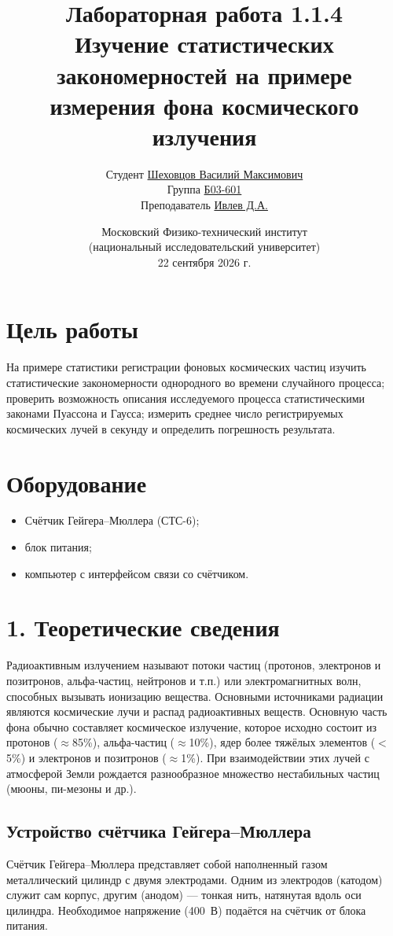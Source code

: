 \documentclass[12pt,a4paper]{article}
\title{\textbf{Лабораторная работа 1.1.4}\\
Изучение статистических закономерностей на примере измерения фона космического излучения}
\author{
    Студент \underline{Шеховцов Василий Максимович}\\
    Группа \underline{Б03-601}\\
    Преподаватель \underline{Ивлев Д.А.}
}
\date{Московский Физико-технический институт\\
(национальный исследовательский университет)\\
22 сентября 2026 г.}
\begin{document}
\maketitle

\section*{Цель работы}

На примере статистики регистрации фоновых космических частиц изучить статистические закономерности однородного во времени случайного процесса; проверить возможность описания исследуемого процесса статистическими законами Пуассона и Гаусса; измерить среднее число регистрируемых космических лучей в секунду и определить погрешность результата.

\section*{Оборудование}

\begin{itemize}
    \item Счётчик Гейгера--Мюллера (СТС-6);
    \item блок питания;
    \item компьютер с интерфейсом связи со счётчиком.
\end{itemize}

\section*{1. Теоретические сведения}

Радиоактивным излучением называют потоки частиц (протонов, электронов и позитронов, альфа-частиц, нейтронов и т.п.) или электромагнитных волн, способных вызывать ионизацию вещества. Основными источниками радиации являются космические лучи и распад радиоактивных веществ. Основную часть фона обычно составляет космическое излучение, которое исходно состоит из протонов ($\approx$85\%), альфа-частиц ($\approx$10\%), ядер более тяжёлых элементов ($<$5\%) и электронов и позитронов ($\approx$1\%). При взаимодействии этих лучей с атмосферой Земли рождается разнообразное множество нестабильных частиц (мюоны, пи-мезоны и др.).

\subsection*{Устройство счётчика Гейгера--Мюллера}

Счётчик Гейгера--Мюллера представляет собой наполненный газом металлический цилиндр с двумя электродами. Одним из электродов (катодом) служит сам корпус, другим (анодом) — тонкая нить, натянутая вдоль оси цилиндра. Необходимое напряжение (400~В) подаётся на счётчик от блока питания.
\end{document}
